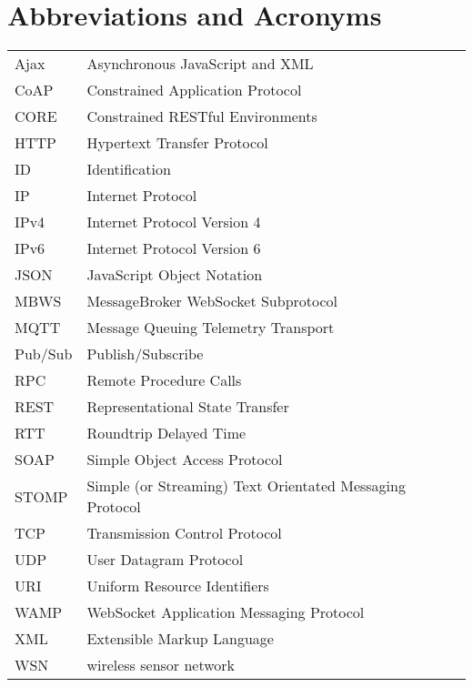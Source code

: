 \chapter*{Abbreviations and Acronyms}


\noindent
\begin{longtable}{@{}p{}p{}@{}}
Ajax & Asynchronous JavaScript and XML \\
CoAP & Constrained Application Protocol \\
CORE & Constrained RESTful Environments \\
HTTP & Hypertext Transfer Protocol \\
ID & Identification \\
IP & Internet Protocol \\
IPv4 & Internet Protocol Version 4 \\
IPv6 & Internet Protocol Version 6 \\
JSON & JavaScript Object Notation \\
MBWS & MessageBroker WebSocket Subprotocol \\
MQTT & Message Queuing Telemetry Transport \\
Pub/Sub & Publish/Subscribe \\
RPC & Remote Procedure Calls \\
REST & Representational State Transfer \\
RTT & Roundtrip Delayed Time \\
SOAP & Simple Object Access Protocol \\
STOMP & Simple (or Streaming) Text Orientated Messaging Protocol \\
TCP & Transmission Control Protocol \\
UDP & User Datagram Protocol \\
URI & Uniform Resource Identifiers \\
WAMP & WebSocket Application Messaging Protocol \\
XML & Extensible Markup Language \\
WSN & wireless sensor network \\
\end{longtable}
